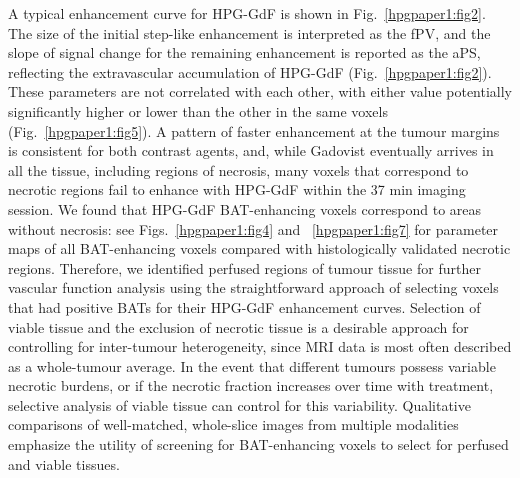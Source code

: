A typical enhancement curve for HPG-GdF is shown in Fig.~\ref{hpgpaper1:fig2}.
The size of the initial step-like enhancement is interpreted as the fPV, and the slope of signal change for the remaining enhancement is reported as the aPS, reflecting the extravascular accumulation of HPG-GdF (Fig.~\ref{hpgpaper1:fig2}).
These parameters are not correlated with each other, with either value potentially significantly higher or lower than the other in the same voxels (Fig.~\ref{hpgpaper1:fig5}).
A pattern of faster enhancement at the tumour margins is consistent for both contrast agents, and, while Gadovist eventually arrives in all the tissue, including regions of necrosis, many voxels that correspond to necrotic regions fail to enhance with HPG-GdF within the 37 min imaging session.
We found that HPG-GdF BAT-enhancing voxels correspond to areas without necrosis: see Figs.~\ref{hpgpaper1:fig4} and ~\ref{hpgpaper1:fig7} for parameter maps of all BAT-enhancing voxels compared with histologically validated necrotic regions.
Therefore, we identified perfused regions of tumour tissue for further vascular function analysis using the straightforward approach of selecting voxels that had positive BATs for their HPG-GdF enhancement curves.
Selection of viable tissue and the exclusion of necrotic tissue is a desirable approach for controlling for inter-tumour heterogeneity, since MRI data is most often described as a whole-tumour average.
In the event that different tumours possess variable necrotic burdens, or if the necrotic fraction increases over time with treatment, selective analysis of viable tissue can control for this variability.
Qualitative comparisons of well-matched, whole-slice images from multiple modalities emphasize the utility of screening for BAT-enhancing voxels to select for perfused and viable tissues.

